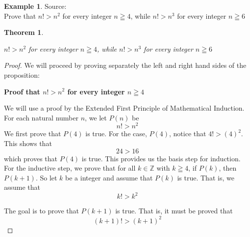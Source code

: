 \documentclass{book}
\newtheorem{theorem}{Theorem}[section]
\theoremstyle{definition}
\newtheorem{example}{Example}[definition]
\theoremstyle{remark}
\newcommand{\bb}[1]{\mathbb{#1}}
\begin{document}
\newpage
\begin{example}
Source: \cite[Chap.1, S.1.1, Prob.1.1, Q.3]{david} \\ 

Prove that $n! > n^2$ for every integer $n \geqq 4$, while $n! > n^3$ for every integer $n \geqq 6$ 
\begin{tcolorbox}
    \begin{theorem}
        \begin{center}
            $n! > n^2$ for every integer $n \geqq 4$, while $n! > n^3$ for every integer $n \geqq 6$                
        \end{center}
    \end{theorem}
\end{tcolorbox}

\begin{proof}
    We will proceed by proving separately the left and right hand sides of the proposition: \\
    
    \begin{flushleft} \textbf{Proof that $n! > n^2$ for every integer $n \geqq 4$} \end{flushleft}
            We will use a proof by the Extended First Principle of Mathematical Induction. For each natural number $n$, we let $P(n)$ be
                \begin{equation*}
                    n! > n^2
                \end{equation*}
            We first prove that $P(4)$ is true. For the case, $P(4)$, notice that $4! > (4)^2$. This shows that   
                \begin{equation*}
                     24 > 16
                \end{equation*}
            which proves that $P(4)$ is true. This provides us the basis step for induction. \\ 
            
            For the inductive step, we prove that for all $k \in \bb{Z}$ with $k \geqq 4$, if $P(k)$, then $P(k+1)$. So let $k$ be a integer and assume that $P(k)$ is true. That is, we assume that 
                \begin{equation*}
                   k! > k^2
                \end{equation*}
            
            The goal is to prove that $P(k+1)$ is true. That is, it must be proved that  
                \begin{equation}
                    (k+1)! > (k+1)^2 
                \end{equation}
            

\end{proof}
\end{example}
\end{document}
